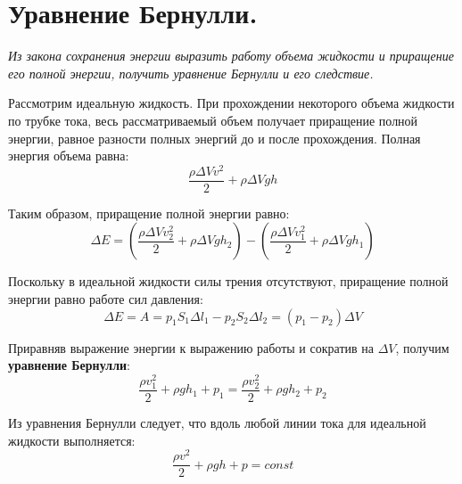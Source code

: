 \documentclass{article}
\begin{document}
    \section{Уравнение Бернулли.}
    \par
      \textit{Из закона сохранения энергии выразить работу объема жидкости и приращение его полной энергии, получить уравнение Бернулли и его следствие.}\\
    \par  
      Рассмотрим идеальную жидкость. При прохождении некоторого объема жидкости по трубке тока, весь рассматриваемый объем получает приращение полной энергии, равное разности полных энергий до и после прохождения. Полная энергия объема равна:
      \begin{equation}
	\frac{\rho\Delta Vv^2}{2}+\rho\Delta Vgh
      \end{equation}
    \par
      Таким образом, приращение полной энергии равно:
      \begin{equation}
	\Delta E=(\frac{\rho\Delta V v_2^2}{2}+\rho\Delta Vgh_2)-(\frac{\rho\Delta V v_1^2}{2}+\rho\Delta Vgh_1)
      \end{equation}
    \par
      Поскольку в идеальной жидкости силы трения отсутствуют, приращение полной энергии равно работе сил давления:
      \begin{equation}
	\Delta E = A = p_1S_1\Delta l_1 - p_2S_2\Delta l_2 = (p_1-p_2)\Delta V
      \end{equation}
    \par
      Приравняв выражение энергии к выражению работы и сократив на $\Delta V$, получим \textbf{уравнение Бернулли}:
      \begin{equation}
	\frac{\rho v_1^2}{2}+\rho gh_1+p_1=\frac{\rho v_2^2}{2}+\rho gh_2+p_2
      \end{equation}
    \par
      Из уравнения Бернулли следует, что вдоль любой линии тока для идеальной жидкости выполняется:
      \begin{equation}
	\frac{\rho v^2}{2}+\rho gh+p=const
      \end{equation}
  \clearpage
    
\end{document}
